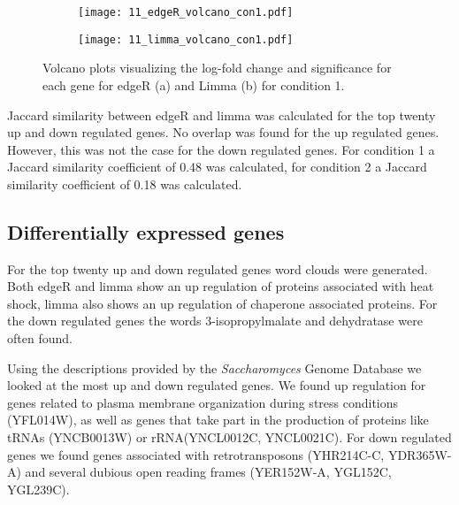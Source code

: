 \begin{figure}[H]
    \centering
    \begin{subfigure}[b]{0.45\textwidth} 
        \centering
        \texttt{[image: 11\_edgeR\_volcano\_con1.pdf]} 
        \caption{}
        \label{fig:vol_edgeR_1}
    \end{subfigure}
    \hfill %
    \begin{subfigure}[b]{0.45\textwidth} %
        \centering
        \texttt{[image: 11\_limma\_volcano\_con1.pdf]} %
        \caption{}
        \label{fig:vol_edgeR_2}
    \end{subfigure}
    \caption{Volcano plots visualizing the log-fold change 
    and significance for each gene for edgeR (a) and Limma (b) for condition 1.}
    \label{fig:vol_edgeR}
\end{figure}

Jaccard similarity between edgeR and limma was calculated for the top twenty up and down regulated genes. No overlap 
was found for the up regulated genes. However, this was not the case for the down regulated genes.
For condition 1 a Jaccard similarity coefficient of 0.48 was calculated, for condition 2 a Jaccard 
similarity coefficient of 0.18 was calculated.

\subsection{Differentially expressed genes}

For the top twenty up and down regulated genes word clouds were generated. 
Both edgeR and limma show an up regulation of proteins associated with heat shock, 
limma also shows an up regulation of chaperone associated proteins. 
For the down regulated genes the words 3-isopropylmalate and dehydratase were often found.

Using the descriptions provided by the \textit{Saccharomyces} Genome Database \cite{noauthor_saccharomyces_nodate}
we looked at the most up and down regulated genes. We found up regulation for genes related to 
plasma membrane organization during stress conditions (YFL014W), as well as genes that 
take part in the production of proteins like tRNAs (YNCB0013W) or rRNA(YNCL0012C, YNCL0021C).
For down regulated genes we found genes associated with retrotransposons (YHR214C-C, YDR365W-A) 
and several dubious open reading frames (YER152W-A, YGL152C, YGL239C).



